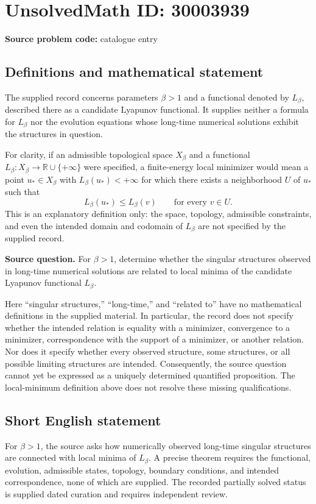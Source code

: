 \documentclass[11pt]{article}
\newcommand{\R}{\mathbb{R}}
\begin{document}
\section*{UnsolvedMath ID: 30003939}
\textbf{Source problem code:} catalogue entry
\subsection{Definitions and mathematical statement}
The supplied record concerns parameters $\beta>1$ and a functional denoted by $L_{\beta}$, described there as a candidate Lyapunov functional. It supplies neither a formula for $L_{\beta}$ nor the evolution equations whose long-time numerical solutions exhibit the structures in question.

For clarity, if an admissible topological space $X_{\beta}$ and a functional $L_{\beta}\colon X_{\beta}\to\R\cup\{+\infty\}$ were specified, a finite-energy local minimizer would mean a point $u_*\in X_{\beta}$ with $L_{\beta}(u_*)<+\infty$ for which there exists a neighborhood $U$ of $u_*$ such that
\[
L_{\beta}(u_*)\leq L_{\beta}(v)\qquad\text{for every }v\in U.
\]
This is an explanatory definition only: the space, topology, admissible constraints, and even the intended domain and codomain of $L_{\beta}$ are not specified by the supplied record.

\textbf{Source question.} For $\beta>1$, determine whether the singular structures observed in long-time numerical solutions are related to local minima of the candidate Lyapunov functional $L_{\beta}$.

Here ``singular structures,'' ``long-time,'' and ``related to'' have no mathematical definitions in the supplied material. In particular, the record does not specify whether the intended relation is equality with a minimizer, convergence to a minimizer, correspondence with the support of a minimizer, or another relation. Nor does it specify whether every observed structure, some structures, or all possible limiting structures are intended. Consequently, the source question cannot yet be expressed as a uniquely determined quantified proposition. The local-minimum definition above does not resolve these missing qualifications.
\subsection{Short English statement}
For $\beta>1$, the source asks how numerically observed long-time singular structures are connected with local minima of $L_{\beta}$. A precise theorem requires the functional, evolution, admissible states, topology, boundary conditions, and intended correspondence, none of which are supplied. The recorded partially solved status is supplied dated curation and requires independent review.
\end{document}
